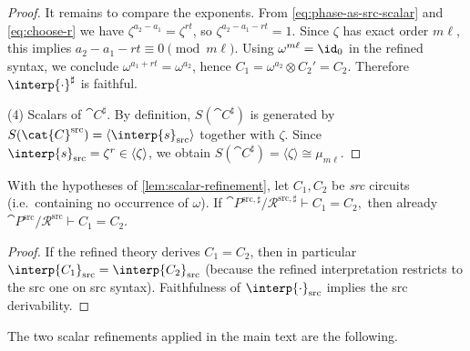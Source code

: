 \begin{proof}
It remains to compare the exponents.  From \eqref{eq:phase-as-src-scalar} and \eqref{eq:choose-r} we have
$\zeta^{a_2-a_1}=\zeta^{rt}$, so $\zeta^{a_2-a_1-rt}=1$.  Since $\zeta$ has exact order $m\ell$, this implies
\(
  a_2-a_1-rt \equiv 0 \pmod{m\ell}.
\)
Using $\omega^{m\ell}=\id_0$ in the refined syntax, we conclude $\omega^{a_1+rt}=\omega^{a_2}$, hence
\(
  C_1=\omega^{a_2}\otimes C_2' = C_2.
\)
Therefore $\interp{\cdot}^{\sharp}$ is faithful.

(4) Scalars of $ \cat{C}^{\sharp}$.
By definition, $S( \cat{C}^{\sharp})$ is generated by $S( \cat{C}^{\mathrm{src}})=\langle \interp{s}_{\mathrm{src}}\rangle$
together with $\zeta$.  Since $\interp{s}_{\mathrm{src}}=\zeta^r\in\langle \zeta\rangle$, we obtain
$S( \cat{C}^{\sharp})=\langle \zeta\rangle\cong \mu_{m\ell}$.
\end{proof}

\begin{corollary}\label{cor:scalar-refinement-conservative}
With the hypotheses of \cref{lem:scalar-refinement}, let $C_1,C_2$ be \emph{src} circuits
(i.e.\ containing no occurrence of $\omega$).  If
\(
  \cat{P}^{\mathrm{src},\sharp}/\mathcal{R}^{\mathrm{src},\sharp}\vdash C_1=C_2,
\)
then already
\(
  \cat{P}^{\mathrm{src}}/\mathcal{R}^{\mathrm{src}}\vdash C_1=C_2.
\)
\end{corollary}
\begin{proof}
If the refined theory derives $C_1=C_2$, then in particular $\interp{C_1}_{\mathrm{src}}=\interp{C_2}_{\mathrm{src}}$
(because the refined interpretation restricts to the src one on src syntax).  Faithfulness of
$\interp{\cdot}_{\mathrm{src}}$ implies the src derivability.
\end{proof}


The two scalar refinements applied in the main text are the following.

